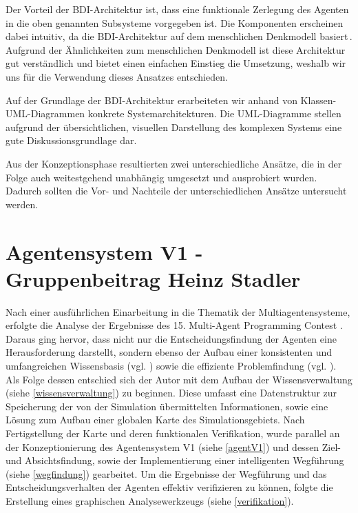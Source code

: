 \documentclass[runningheads]{llncs}
\begin{document}
Der Vorteil der BDI-Architektur ist, dass eine funktionale Zerlegung des Agenten in die oben genannten Subsysteme vorgegeben ist. Die Komponenten erscheinen dabei intuitiv, da die BDI-Architektur auf dem menschlichen Denkmodell basiert\,\cite{Weiss2000}. Aufgrund der Ähnlichkeiten zum menschlichen Denkmodell ist diese Architektur gut verständlich und bietet einen einfachen Einstieg die Umsetzung, weshalb wir uns für die Verwendung dieses Ansatzes entschieden.

Auf der Grundlage der BDI-Architektur erarbeiteten wir anhand von Klassen-UML-Diagrammen konkrete Systemarchitekturen. Die UML-Diagramme stellen aufgrund der übersichtlichen, visuellen Darstellung des komplexen Systems eine gute Diskussionsgrundlage dar.

Aus der Konzeptionsphase resultierten zwei unterschiedliche Ansätze, die in der Folge auch weitestgehend unabhängig umgesetzt und ausprobiert wurden. Dadurch sollten die Vor- und Nachteile der unterschiedlichen Ansätze untersucht werden.


\section{Agentensystem V1 - Gruppenbeitrag Heinz Stadler}
Nach einer ausführlichen Einarbeitung in die Thematik der Multiagentensysteme, erfolgte die Analyse der Ergebnisse des 15. Multi-Agent Programming Contest \cite{Ahlbrecht2021}. Daraus ging hervor, dass nicht nur die Entscheidungsfindung der Agenten eine Herausforderung darstellt, sondern ebenso der Aufbau einer konsistenten und umfangreichen Wissensbasis (vgl. \cite[S. 29]{Ahlbrecht2021}) sowie die effiziente Problemfindung (vgl. \cite[S. 17]{Ahlbrecht2021}). \\
Als Folge dessen entschied sich der Autor mit dem Aufbau der Wissensverwaltung (siehe \ref{wissensverwaltung}) zu beginnen. Diese umfasst eine Datenstruktur zur Speicherung der von der Simulation übermittelten Informationen, sowie eine Lösung zum Aufbau einer globalen Karte des Simulationsgebiets. Nach Fertigstellung der Karte und deren funktionalen Verifikation, wurde parallel an der Konzeptionierung des Agentensystem V1 (siehe \ref{agentV1}) und dessen Ziel- und Absichtsfindung, sowie der Implementierung einer intelligenten Wegführung (siehe \ref{wegfindung}) gearbeitet. Um die Ergebnisse der Wegführung und das Entscheidungsverhalten der Agenten effektiv verifizieren zu können, folgte die Erstellung eines graphischen Analysewerkzeugs (siehe \ref{verifikation}).
 
\end{document}
